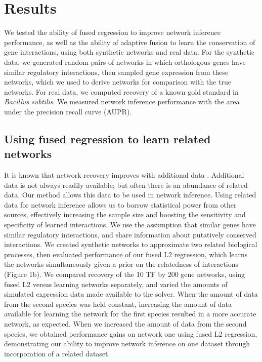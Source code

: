 \documentclass[11pt]{article}
\begin{document}
\section{Results}
We tested the ability of fused regression to improve network inference performance, as well as the ability of adaptive fusion to learn the conservation of gene interactions, using both synthetic networks and real data. For the synthetic data, we generated random pairs of networks in which orthologous genes have similar regulatory interactions, then sampled gene expression from these networks, which we used to derive networks for comparison with the true networks. For real data, we computed recovery of a known gold standard in \textit{Bacillus subtilis}. We measured network inference performance with the area under the precision recall curve (AUPR). 

\subsection{Using fused regression to learn related networks}
It is known that network recovery improves with additional data \cite{bar-joseph_computational_2003}. Additional data is not always readily available; but often there is an abundance of related data. Our method allows this data to be used in network inference. Using related data for network inference allows us to borrow statistical power from other sources, effectively increasing the sample size and boosting the sensitivity and specificity of learned interactions. We use the assumption that similar genes have similar regulatory interactions, and share information about putatively conserved interactions. We created synthetic networks to approximate two related biological processes, then evaluated performance of our fused L2 regression, which learns the networks simultaneously given a prior on the relatedness of interactions (Figure 1b). We compared recovery of the 10 TF by 200 gene networks, using fused L2 versus learning networks separately, and varied the amounts of simulated expression data made available to the solver. When the amount of data from the second species was held constant, increasing the amount of data available for learning the network for the first species resulted in a more accurate network, as expected. When we increased the amount of data from the second species, we obtained performance gains on network one using fused L2 regression, demonstrating our ability to improve network inference on one dataset through incorporation of a related dataset.
\end{document}
